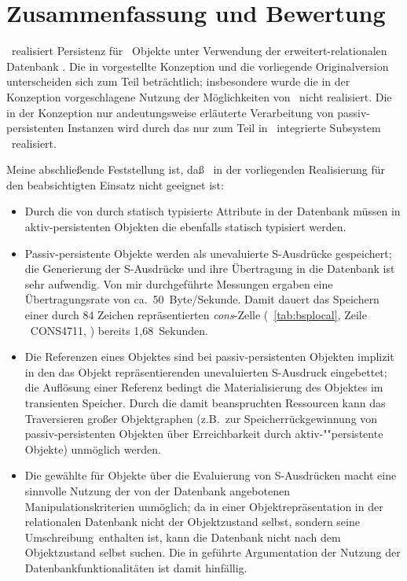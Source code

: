\section{Zusammenfassung und Bewertung}
%
\soh\ realisiert Persistenz f\"{u}r \cl\ Objekte unter Verwendung der
er\-wei\-tert-re\-la\-tio\-na\-len Datenbank \postgres.  Die in
\cite{bib:ro87} vorgestellte Konzeption und die vorliegende
Originalversion unterscheiden sich zum Teil betr\"{a}chtlich;
insbesondere wurde die in der Konzeption vorgeschlagene Nutzung der
M\"{o}glichkeiten von \postgres\ nicht realisiert. Die in der Konzeption
nur andeutungsweise erl\"{a}uterte Verarbeitung von passiv-persistenten
Instanzen wird durch das nur zum Teil in \soh\ integrierte Subsystem
\store\ realisiert.
%
\par{}Meine abschlie\ss{}ende Feststellung ist, da\ss{} \soh\ in der
vorliegenden Realisierung f\"{u}r den beabsichtigten Einsatz nicht
geeignet ist:
\begin{itemize}
%
\item Durch die \representation{} von \Slt[s]\/ durch statisch typisierte
Attribute in der Datenbank m\"{u}ssen in aktiv-persistenten Objekten die
\Slt[s]\/ ebenfalls statisch typisiert werden.
%
\item Passiv-persistente Objekte werden als unevaluierte S-Ausdr\"{u}cke
gespeichert; die Generierung der S-Ausdr\"{u}cke und ihre \"{U}bertragung in
die Datenbank ist sehr aufwendig. Von mir durchgef\"{u}hrte Messungen
ergaben eine \"{U}bertragungsrate von ca.\ 50~Byte/Sekunde. Damit dauert
das Speichern einer durch 84 Zeichen repr\"{a}sentierten {\em
cons\/}-Zelle (\tablename~\ref{tab:bsplocal}, Zeile \
CONS4711, \citepage{\pageref{tab:bsplocal}}) bereits 1,68~Sekunden.
%
\item Die Referenzen eines Objektes sind bei passiv-persistenten
Objekten implizit in den das Objekt repr\"{a}sentierenden unevaluierten
S-Ausdruck eingebettet; die Aufl\"{o}sung einer Referenz bedingt die
Materialisierung des Objektes im transienten Speicher. Durch die damit
beanspruchten Ressourcen kann das Traversieren gro\ss{}er Objektgraphen
(z.B.\ zur Speicherr\"{u}ckgewinnung von passiv-persistenten Objekten
\"{u}ber Erreichbarkeit durch ak\-tiv-""per\-si\-sten\-te Objekte)
unm\"{o}glich werden.
%
\item Die gew\"{a}hlte \representationform{} f\"{u}r Objekte \"{u}ber die
Evaluierung von S-Ausdr\"{u}cken macht eine sinnvolle Nutzung der von der
Datenbank angebotenen Manipulationskriterien unm\"{o}glich; da in einer
Objektrepr\"{a}sentation in der relationalen Datenbank nicht der
Objektzustand selbst, sondern seine \rglq{}Umschreibung\rgrq\ enthalten
ist, kann die Datenbank nicht nach dem Objektzustand selbst suchen.
Die in \cite[\citepage{2}]{bib:ro87} gef\"{u}hrte Argumentation der
Nutzung der Datenbankfunktionalit\"{a}ten ist damit hinf\"{a}llig.
%
\end{itemize}
